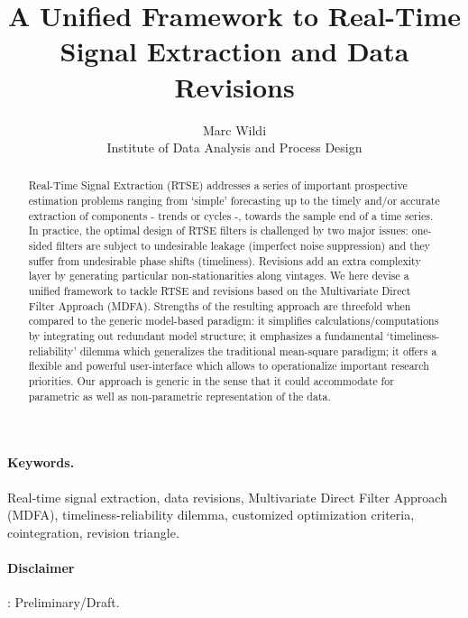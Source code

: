 \documentclass[11pt]{article}
\begin{document}
\title{A Unified Framework to Real-Time Signal Extraction and Data Revisions}
\author{Marc Wildi \\
Institute of Data Analysis and Process
Design}
\maketitle



\begin{abstract}
Real-Time Signal Extraction (RTSE) addresses a series of important prospective estimation problems ranging from `simple' forecasting up to the timely and/or accurate extraction of components - trends or cycles  -, towards the sample end of a time series. In practice, the optimal design of RTSE filters is challenged by two major issues: one-sided filters are subject to undesirable leakage (imperfect noise suppression) and they suffer from undesirable phase shifts (timeliness). Revisions add an extra complexity layer by generating particular non-stationarities along vintages. We here devise a unified framework to tackle RTSE and revisions based on the Multivariate Direct Filter Approach (MDFA).  Strengths of the resulting approach are threefold when compared to the generic model-based paradigm: it simplifies calculations/computations by integrating out redundant model structure; it emphasizes a fundamental `timeliness-reliability' dilemma which generalizes the traditional mean-square paradigm; it offers a flexible and powerful user-interface which allows to operationalize important research priorities. Our approach is generic in the sense that it could accommodate for parametric as well as non-parametric representation of the data.    \noindent
\end{abstract}
%
\paragraph{Keywords.}
Real-time signal extraction, data revisions, Multivariate Direct Filter Approach (MDFA), timeliness-reliability dilemma, customized optimization criteria, cointegration, revision triangle.
%
\paragraph{Disclaimer}: Preliminary/Draft. %
\end{document}

